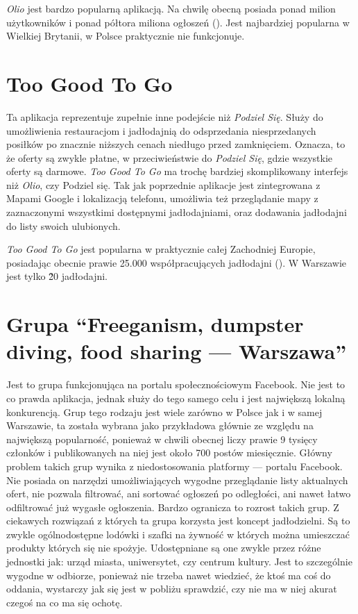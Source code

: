 \documentclass[licencjacka]{pracamgr}
\begin{document}
\textit{Olio} jest bardzo popularną aplikacją. Na chwilę obecną posiada ponad milion użytkowników i ponad półtora miliona ogłoszeń (\cite{olio}). Jest najbardziej popularna w Wielkiej Brytanii, w Polsce praktycznie nie funkcjonuje.

\section{Too Good To Go}
Ta aplikacja reprezentuje zupełnie inne podejście niż \textit{Podziel Się}. Służy do umożliwienia restauracjom i jadłodajnią do odsprzedania niesprzedanych posiłków po znacznie niższych cenach niedługo przed zamknięciem. Oznacza, to że oferty są zwykle płatne, w przeciwieństwie do \textit{Podziel Się}, gdzie wszystkie oferty są darmowe. \textit{Too Good To Go} ma trochę bardziej skomplikowany interfejs niż \textit{Olio}, czy Podziel się. Tak jak poprzednie aplikacje jest zintegrowana z Mapami Google i lokalizacją telefonu, umożliwia też przeglądanie mapy z zaznaczonymi wszystkimi dostępnymi jadłodajniami, oraz dodawania jadłodajni do listy swoich ulubionych.

\textit{Too Good To Go} jest popularna w praktycznie całej Zachodniej Europie, posiadając obecnie prawie 25.000 współpracujących jadłodajni (\cite{tgtg}). W Warszawie jest tylko \~20 jadłodajni.

\section{Grupa ``Freeganism, dumpster diving, food sharing --- Warszawa''}
Jest to grupa funkcjonująca na portalu społecznościowym Facebook. Nie jest to co prawda aplikacja, jednak służy do tego samego celu i jest największą lokalną konkurencją. Grup tego rodzaju jest wiele zarówno w Polsce jak i w samej Warszawie, ta została wybrana jako przykładowa głównie ze względu na największą popularność, ponieważ w chwili obecnej liczy prawie 9 tysięcy członków i publikowanych na niej jest około 700 postów miesięcznie. Główny problem takich grup wynika z niedostosowania platformy --- portalu Facebook. Nie posiada on narzędzi umożliwiających wygodne przeglądanie listy aktualnych ofert, nie pozwala filtrować, ani sortować ogłoszeń po odległości, ani nawet łatwo odfiltrować już wygasłe ogłoszenia. Bardzo ogranicza to rozrost takich grup. Z ciekawych rozwiązań z których ta grupa korzysta jest koncept jadłodzielni. Są to zwykle ogólnodostępne lodówki i szafki na żywność w których można umieszczać produkty których się nie spożyje. Udostępniane są one zwykle przez różne jednostki jak: urząd miasta, uniwersytet, czy centrum kultury. Jest to szczególnie wygodne w odbiorze, ponieważ nie trzeba nawet wiedzieć, że ktoś ma coś do oddania, wystarczy jak się jest w pobliżu sprawdzić, czy nie ma w niej akurat czegoś na co ma się ochotę.
\end{document}
